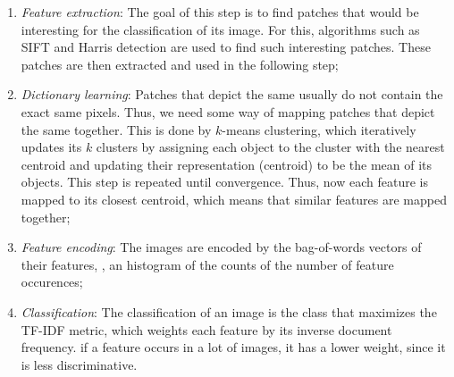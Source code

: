 \begin{enumerate}
  \item \textit{Feature extraction}: The goal of this step is to find patches
    that would be interesting for the classification of its image. For this,
    algorithms such as SIFT and Harris detection are used to find such
    interesting patches. These patches are then extracted and used in the
    following step;
  \item \textit{Dictionary learning}: Patches that depict the same usually do
    not contain the exact same pixels. Thus, we need some way of mapping
    patches that depict the same together. This is done by $k$-means
    clustering, which iteratively updates its $k$ clusters by assigning each
    object to the cluster with the nearest centroid and updating their
    representation (centroid) to be the mean of its objects. This step is
    repeated until convergence. Thus, now each feature is mapped to its closest
    centroid, which means that similar features are mapped together;
  \item \textit{Feature encoding}: The images are encoded by the bag-of-words
    vectors of their features, \ie, an histogram of the counts of the number of
    feature occurences;
  \item \textit{Classification}: The classification of an image is the class
    that maximizes the TF-IDF metric, which weights each feature by its
    inverse document frequency. \Ie if a feature occurs in a lot of images, it
    has a lower weight, since it is less discriminative.
\end{enumerate}
